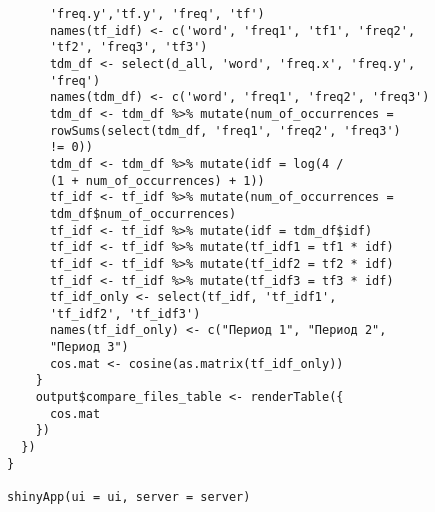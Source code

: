 \documentclass[bachelor, och, diploma ]{SCWorks}
\begin{document}
\begin{verbatim}
      'freq.y','tf.y', 'freq', 'tf')
      names(tf_idf) <- c('word', 'freq1', 'tf1', 'freq2',
      'tf2', 'freq3', 'tf3')
      tdm_df <- select(d_all, 'word', 'freq.x', 'freq.y',
      'freq')
      names(tdm_df) <- c('word', 'freq1', 'freq2', 'freq3')
      tdm_df <- tdm_df %>% mutate(num_of_occurrences = 
      rowSums(select(tdm_df, 'freq1', 'freq2', 'freq3') 
      != 0))
      tdm_df <- tdm_df %>% mutate(idf = log(4 / 
      (1 + num_of_occurrences) + 1))
      tf_idf <- tf_idf %>% mutate(num_of_occurrences = 
      tdm_df$num_of_occurrences)
      tf_idf <- tf_idf %>% mutate(idf = tdm_df$idf)
      tf_idf <- tf_idf %>% mutate(tf_idf1 = tf1 * idf)
      tf_idf <- tf_idf %>% mutate(tf_idf2 = tf2 * idf)
      tf_idf <- tf_idf %>% mutate(tf_idf3 = tf3 * idf)
      tf_idf_only <- select(tf_idf, 'tf_idf1', 
      'tf_idf2', 'tf_idf3')
      names(tf_idf_only) <- c("Период 1", "Период 2",
      "Период 3")
      cos.mat <- cosine(as.matrix(tf_idf_only))
    }
    output$compare_files_table <- renderTable({
      cos.mat
    })
  })
}

shinyApp(ui = ui, server = server)

\end{verbatim}
\end{document}
